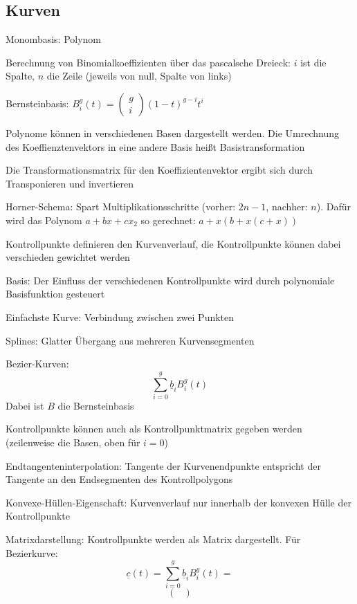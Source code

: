 \documentclass[12pt,landscape]{article}
\begin{document}
\begin{multicols}{3}
\section{Kurven}
\begin{compactitem}
\item Monombasis: Polynom
\item Berechnung von Binomialkoeffizienten über das pascalsche Dreieck: $i$ ist die Spalte, $n$ die Zeile (jeweils von null, Spalte von links)
\item Bernsteinbasis: $B^{g}_{i}(t) = \begin{pmatrix}g \\ i\end{pmatrix} (1-t)^{g-i}t^i$
\item Polynome können in verschiedenen Basen dargestellt werden. Die Umrechnung des Koeffienztenvektors in eine andere Basis heißt Basistransformation 
\item Die Transformationsmatrix für den Koeffizientenvektor ergibt sich durch Transponieren und invertieren
\item Horner-Schema: Spart Multiplikationsschritte (vorher: $2n - 1$, nachher: $n$). Dafür wird das Polynom $a + bx + cx_2$ so gerechnet: $a + x(b + x(c + x))$
\item Kontrollpunkte definieren den Kurvenverlauf, die Kontrollpunkte können dabei verschieden gewichtet werden
\item Basis: Der Einfluss der verschiedenen Kontrollpunkte wird durch polynomiale Basisfunktion gesteuert
\item Einfachste Kurve: Verbindung zwischen zwei Punkten
\item Splines: Glatter Übergang aus mehreren Kurvensegmenten
\item Bezier-Kurven: \[
\sum_{i=0}^{g} \underline{b}_i B_i^g(t)
\] Dabei ist $B$ die Bernsteinbasis
\item Kontrollpunkte können auch als Kontrollpunktmatrix gegeben werden (zeilenweise die Basen, oben für $i = 0$)
\item Endtangenteninterpolation: Tangente der Kurvenendpunkte entspricht der Tangente an den Endsegmenten des Kontrollpolygons
\item Konvexe-Hüllen-Eigenschaft: Kurvenverlauf nur innerhalb der konvexen Hülle der Kontrollpunkte
\item Matrixdarstellung: Kontrollpunkte werden als Matrix dargestellt. Für Bezierkurve: 
\[ \underline{c}(t) = \sum_{i=0}^{g} \underline{b}_i B_i^g(t) = \] \[ \begin{pmatrix}

\end{pmatrix}\]
\end{compactitem}
\end{multicols}
\end{document}
